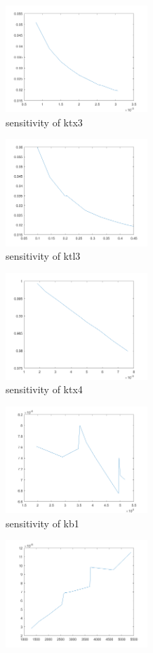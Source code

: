 \begin{figure}[H]
	\begin{subfigure}{0.5\textwidth}
		\includegraphics[height=4cm]{tx3.png}
		\caption{sensitivity of ktx3}
	\end{subfigure}%
	\begin{subfigure}{0.5\textwidth}
		\includegraphics[height=4cm]{tl3.png}
		\caption{sensitivity of ktl3}
	\end{subfigure}
	\begin{subfigure}{0.5\textwidth}
		\includegraphics[height=4cm]{tx4.png}
		\caption{sensitivity of ktx4}
	\end{subfigure}%
	\begin{subfigure}{0.5\textwidth}
		\includegraphics[height=4cm]{b1.png}
		\caption{sensitivity of kb1}
	\end{subfigure}
	\begin{subfigure}{0.5\textwidth}
		\includegraphics[height=4cm]{b2.png}

\end{subfigure}
\end{figure}
